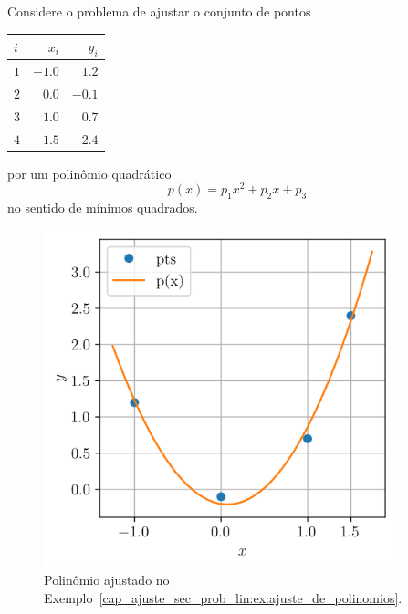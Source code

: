 \begin{ex}\label{cap_ajuste_sec_prob_lin:ex:ajuste_de_polinomios}
  Considere o problema de ajustar o conjunto de pontos
  \begin{center}
    \begin{tabular}{lrr}
      $i$ & $x_i$ & $y_i$ \\\midrule
      $1$ & $-1.0$ &  $1.2$ \\
      $2$ &  $0.0$ & $-0.1$ \\
      $3$ &  $1.0$ &  $0.7$ \\
      $4$ &  $1.5$ &  $2.4$ \\\bottomrule
    \end{tabular}
  \end{center}
  por um polinômio quadrático
  \begin{equation}
    p(x) = p_1x^2 + p_2x + p_3
  \end{equation}
  no sentido de mínimos quadrados.  

  \begin{figure}[htb]
    \centering
    \includegraphics[width=4in]{cap_ajuste/dados/fig_mqPoli/fig.png}
    \caption{Polinômio ajustado no Exemplo~\ref{cap_ajuste_sec_prob_lin:ex:ajuste_de_polinomios}.}
    \label{cap_ajuste_sec_prob_lin:fig:ex_mq_poli}
  \end{figure}
  

\end{ex}
